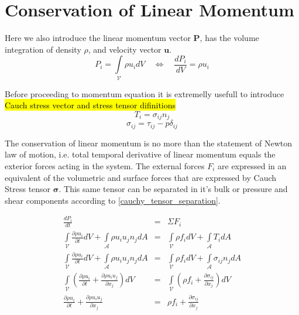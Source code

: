 

\section{Conservation of Linear Momentum}
Here we also introduce the linear momentum vector $\mathbf{P}$, has the volume
integration of density $\rho$, and velocity vector $\mathbf{u}$.
\begin{equation}
P_i=\int\limits_{\mathcal{V}} \rho u_i dV \quad  \Leftrightarrow \quad \frac{dP_i}{dV}= \rho u_i 
\end{equation}

Before proceeding to momentum equation it is extremelly usefull to introduce
\hl{Cauch stress vector and stress tensor difinitions}
\begin{equation}
    \label{cauchy_stress_vector}
    T_i = \sigma_{ij} n_j
\end{equation}
\begin{equation}
    \label{cauchy_tensor_separation}
    \sigma_{ij} = \tau_{ij} - p \delta_{ij}
\end{equation}

The conservation of linear momentum is no more than the statement of Newton law of motion, i.e. total temporal derivative of linear momentum equals the exterior forces acting in the system. The external forces  $F_i$ are expressed in  an equivalent of the volumetric and surface forces that are expressed by Cauch Stress tensor $\boldsymbol \sigma$. This same tensor can be separated in it's bulk or pressure and shear components according to \eqref{cauchy_tensor_separation}.

\begin{eqnarray}
    \frac{dP_i}{dt} &=& \Sigma F_i \\
    \int\limits_{\mathcal{V}} \frac{\partial \rho u_i}{\partial t} dV + \int\limits_{\mathcal{A}} \rho u_i u_j n_j dA
    &=& \int\limits_{\mathcal{V}} \rho f_i dV + \int\limits_{\mathcal{A}} T_i dA \\
    \int\limits_{\mathcal{V}} \frac{\partial \rho u_i}{\partial t} dV + \int\limits_{\mathcal{A}} \rho u_i u_j n_j dA
    &=& \int\limits_{\mathcal{V}} \rho f_i dV + \int\limits_{\mathcal{A}} \sigma_{ij}  n_j dA \\
    \int\limits_{\mathcal{V}} \left( \frac{\partial \rho u_i}{\partial t} + \frac{\partial \rho u_i u_j}{\partial x_j}\right)dV
    &=& \int\limits_{\mathcal{V}} \left( \rho f_i  + \frac{\partial \sigma_{ij}}{\partial x_j} \right)dV \\
    \frac{\partial \rho u_i}{\partial t} +  \frac{\partial \rho u_i u_j}{\partial x_j}
    &=& \rho f_i + \frac{\partial \sigma_{ij}}{\partial x_j}
\end{eqnarray}

